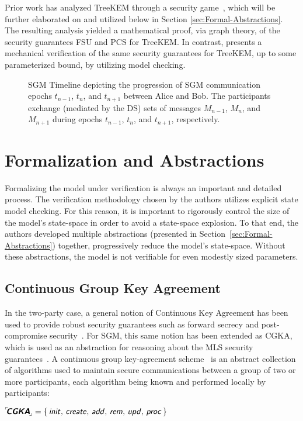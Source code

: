 \documentclass[runningheads]{llncs}
\newcommand{\Abrev}[1]{\gls{#1}}
\begin{document}
Prior work has analyzed TreeKEM through a security game~\cite{alwen2020security}, which will be further elaborated on and utilized below in Section \ref{sec:Formal-Abstractions}.
The resulting analysis yielded a mathematical proof, via graph theory, of the security guarantees \Abrev{FSU} and  \Abrev{PCS} for TreeKEM.
In contrast, presents a mechanical verification of the same security guarantees for TreeKEM, up to some parameterized bound,  by utilizing model checking.



\begin{figure*}[ht!]
\centering
{}%
\caption{\Abrev{SGM} Timeline depicting the progression of \Abrev{SGM} communication epochs $t_{n-1}$, $t_{n}$, and $t_{n+1}$ between Alice and Bob. The participants exchange (mediated by the \Abrev{DS}) sets of messages $M_{n-1}$, $M_{n}$, and $M_{n+1}$ during epochs $t_{n-1}$, $t_{n}$, and $t_{n+1}$, respectively.}%
\label{fig:SGM-Timeline}%
\end{figure*}


\section{Formalization and Abstractions\label{sec:Formal-Abstractions}}

Formalizing the model under verification is always an important and detailed process.
The verification methodology chosen by the authors utilizes explicit state model checking.
For this reason, it is important to rigorously control the size of the model's state-space in order to avoid a state-space explosion. 
To that end, the authors developed multiple abstractions (presented in Section~\ref{sec:Formal-Abstractions}) together, progressively reduce the model's state-space. 
Without these abstractions, the model is not verifiable for even modestly sized parameters.

\subsection{Continuous Group Key Agreement\label{sec:CGKA}}
In the two-party case, a general notion of Continuous Key Agreement has been used to provide robust security guarantees such as forward secrecy and post-compromise security~\cite{perrin2013axolotl,perrin2016double,alwen2019double}.
For \Abrev{SGM}, this same notion has been extended as \Abrev{CGKA}, which is used as an abstraction for reasoning about the \Abrev{MLS} security guarantees~\cite{alwen2020security}.
A continuous group key-agreement scheme \CGKAdef\ is an abstract collection of algorithms used to maintain secure communications between a group of two or more participants, each algorithm being known and performed locally by participants:\\[2mm]
\centerline{${}^{\ulcorner}\!\!\textbf{\textsf{\textsl{CGKA}}}_{\!\lrcorner} = \left\{\,\text{\sffamily{\textsl{init}}},\, \text{\sffamily{\textsl{create}}},\, \text{\sffamily{\textsl{add}}},\, \text{\sffamily{\textsl{rem}}},\, \text{\sffamily{\textsl{upd}}},\, \text{\sffamily{\textsl{proc}}}\,\right\}$}\\[-3mm]
\end{document}
